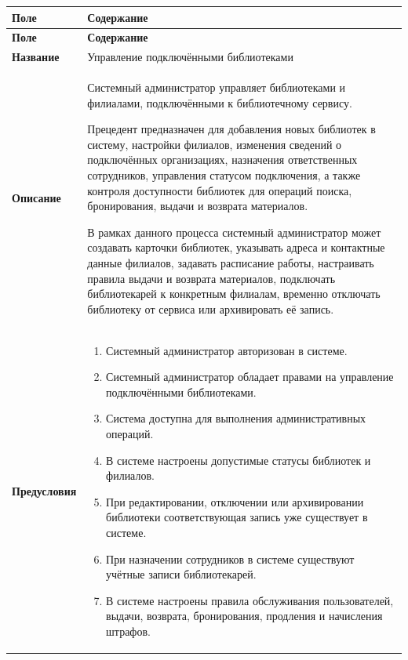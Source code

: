 \documentclass[12pt,a4paper]{article}
\begin{document}
		\begin{xltabular}{\textwidth}{
				|>{\raggedright\arraybackslash}p{2.7cm}
				|>{\raggedright\arraybackslash}X|
			}
			\hline
			\textbf{Поле} & \textbf{Содержание} \\
			\hline
			\endfirsthead
			
			\hline
			\textbf{Поле} & \textbf{Содержание} \\
			\hline
			\endhead
			
			\hline
			\endfoot
			
			\textbf{Название} &
			Управление подключёнными библиотеками \\
			\hline
			
			\textbf{Описание} &
			Системный администратор управляет библиотеками и филиалами,
			подключёнными к библиотечному сервису.
			
			Прецедент предназначен для добавления новых библиотек в систему,
			настройки филиалов, изменения сведений о подключённых организациях,
			назначения ответственных сотрудников, управления статусом подключения,
			а также контроля доступности библиотек для операций поиска,
			бронирования, выдачи и возврата материалов.
			
			В рамках данного процесса системный администратор может создавать
			карточки библиотек, указывать адреса и контактные данные филиалов,
			задавать расписание работы, настраивать правила выдачи и возврата
			материалов, подключать библиотекарей к конкретным филиалам,
			временно отключать библиотеку от сервиса или архивировать её запись. \\
			\hline
			
			\textbf{Предусловия} &
			\begin{enumerate}
				\item Системный администратор авторизован в системе.
				\item Системный администратор обладает правами на управление
				подключёнными библиотеками.
				\item Система доступна для выполнения административных операций.
				\item В системе настроены допустимые статусы библиотек и филиалов.
				\item При редактировании, отключении или архивировании библиотеки
				соответствующая запись уже существует в системе.
				\item При назначении сотрудников в системе существуют учётные записи
				библиотекарей.
				\item В системе настроены правила обслуживания пользователей, выдачи,
				возврата, бронирования, продления и начисления штрафов.
			\end{enumerate} \\
			\hline
			

\end{xltabular}
\end{document}
